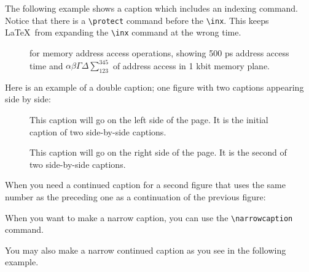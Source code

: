 \documentclass{kapproc} %
\begin{document}
\noindent
The following example shows a caption which includes an indexing command.
Notice that there is a \verb+\protect+ command before the \verb+\inx+.
This keeps \LaTeX\ from expanding the \verb+\inx+ command at
the wrong time.

\begin{figure}[ht]
\caption{\protect{} for memory address access operations, showing 500 ps
address access time and $\alpha\beta\Gamma\Delta\sum_{123}^{345}$
\protect{}%
\protect{} of address access in 1 kbit
memory plane.}
\end{figure}

\noindent
Here is an example of a double caption; one figure with two
captions appearing side by side:

\begin{figure}[ht]
\sidebyside
{\caption{This caption will go on the left side of
the page. It is the initial caption of two side-by-side captions.}}
{\caption{This caption will go on the right side of
the page. It is the second of two side-by-side captions.}}
\end{figure}

\noindent
When you need a continued caption for a second figure that
uses the same number as the preceding one as a continuation
of the previous figure:

\begin{figure}[ht]
\end{figure}

\noindent
When you want to make a narrow caption, you can use the
\verb=\narrowcaption= command.

\begin{figure}[ht]
\end{figure}

\noindent
You may also make a narrow continued caption as you see in
the following example.

\begin{figure}[ht]
\end{figure}
\end{document}
